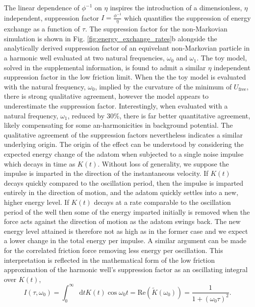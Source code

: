 \documentclass[7pt]{article}
\newcommand*{\diff}{\mathop{}\!\mathrm{d}}
\begin{document}
The linear dependence of $\phi^{-1}$ on $\eta$ inspires the introduction of a dimensionless, $\eta$ independent, suppression factor $I = \frac{\phi^{-1}}{\eta}$ which quantifies the suppression of energy exchange as a function of $\tau$. The suppression factor for the non-Markovian simulation is shown in Fig. \ref{fig:energy_exchange_rates}b alongside the analytically derived suppression factor of an equivelant non-Markovian particle in a harmonic well evaluated at two natural frequencies, $\omega_0$ and $\omega_1$. The toy model, solved in the supplemental information, is found to admit a similar $\eta$ independent suppression factor in the low friction limit. When the the toy model is evaluated with the natural frequency, $\omega_0$, implied by the curvature of the minimum of $U_{\text{free}}$, there is strong qualitative agreement, however the model appears to underestimate the suppression factor. Interestingly, when evaluated with a natural frequency, $\omega_1$, reduced by $30$\%, there is far better quantitative agreement, likely compensating for some an-harmonicities in background potential. The qualitative agreement of the suppression factors nevertheless indicates a similar underlying origin. The origin of the effect can be understood by considering the expected energy change of the adatom when subjected to a single noise impulse which decays in time as $K(t)$. Without loss of generality, we suppose the impulse is imparted in the direction of the instantaneous velocity. If $K(t)$ decays quickly compared to the oscillation period, then the impulse is imparted entirely in the direction of motion, and the adatom quickly settles into a new, higher energy level. If $K(t)$ decays at a rate comparable to the oscillation period of the well then some of the energy imparted initially is removed when the force acts against the direction of motion as the adatom swings back. The new energy level attained is therefore not as high as in the former case and we expect a lower change in the total energy per impulse. A similar argument can be made for the correlated friction force removing less energy per oscillation. This interpretation is reflected in the mathematical form of the low friction approximation of the harmonic well's suppression factor as an oscillating integral over $K(t)$,
\begin{equation}
	I(\tau, \omega_0) = \int_0^{\infty}\diff{t}K(t)\cos{\omega_0t} = \mathrm{Re}\left(\tilde{K}(\omega_0)\right) = \frac{1}{1+\left(\omega_0\tau\right)^2}.
	\label{eq:suppression_factor}
\end{equation}
\end{document}
